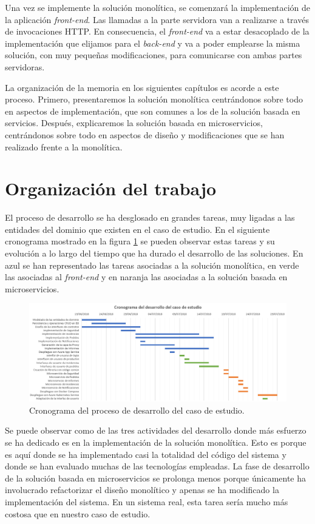 \documentclass[11pt,spanish,listoffigures]{tfgetsinf}
\begin{document}
Una vez se implemente la solución monolítica, se comenzará la implementación de la aplicación \textit{front-end}. Las llamadas a la parte servidora van a realizarse a través de invocaciones HTTP. En consecuencia, el \textit{front-end} va a estar desacoplado de la implementación que elijamos para el \textit{back-end} y va a poder emplearse la misma solución, con muy pequeñas modificaciones, para comunicarse con ambas partes servidoras.

La organización de la memoria en los siguientes capítulos es acorde a este proceso. Primero, presentaremos la solución monolítica centrándonos sobre todo en aspectos de implementación, que son comunes a los de la solución basada en servicios. Después, explicaremos la solución basada en microservicios, centrándonos sobre todo en aspectos de diseño y modificaciones que se han realizado frente a la monolítica.

\section{Organización del trabajo}

El proceso de desarrollo se ha desglosado en grandes tareas, muy ligadas a las entidades del dominio que existen en el caso de estudio. En el siguiente cronograma mostrado en la figura \ref{fig:Cronograma} se pueden observar estas tareas y su evolución a lo largo del tiempo que ha durado el desarrollo de las soluciones. En azul se han representado las tareas asociadas a la solución monolítica, en verde las asociadas al \textit{front-end} y en naranja las asociadas a la solución basada en microservicios.

\begin{figure}[h]
\centering
\includegraphics[scale=0.5]{Cronograma}
\caption{Cronograma del proceso de desarrollo del caso de estudio.}
\label{fig:Cronograma}
\end{figure}

Se puede observar como de las tres actividades del desarrollo donde más esfuerzo se ha dedicado es en la implementación de la solución monolítica. Esto es porque es aquí donde se ha implementado casi la totalidad del código del sistema y donde se han evaluado muchas de las tecnologías empleadas. La fase de desarrollo de la solución basada en microservicios se prolonga menos porque únicamente ha involucrado refactorizar el diseño monolítico y apenas se ha modificado la implementación del sistema. En un sistema real, esta tarea sería mucho más costosa que en nuestro caso de estudio.
\end{document}
